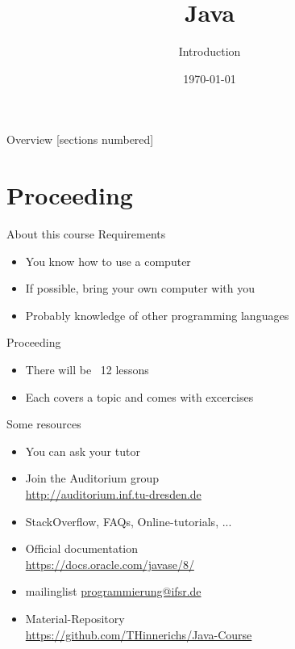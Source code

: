 


\title{Java}
\subtitle{Introduction}
\date{\today}




\begin{frame}
	\titlepage
\end{frame}
\begin{frame}{Overview}
	[sections numbered]
	\tableofcontents
\end{frame}

\section{Proceeding}
\begin{frame}{About this course}
	Requirements
	\begin{itemize}
		\item You know how to use a computer
        \item If possible, bring your own computer with you
		\item Probably knowledge of other programming languages
	\end{itemize}
	Proceeding
	\begin{itemize}
		\item There will be ~12 lessons
		\item Each covers a topic and comes with excercises
	\end{itemize}
\end{frame}

\begin{frame}{Some resources}
	\begin{itemize}
		\item You can ask your tutor
		\item Join the Auditorium group \hfill \\
			\url{http://auditorium.inf.tu-dresden.de}
		\item StackOverflow, FAQs, Online-tutorials, ... \hfill \\
		\item Official documentation \hfill \\
			\url{https://docs.oracle.com/javase/8/}
        \item mailinglist \url{programmierung@ifsr.de}
		\item Material-Repository \\
			\url{https://github.com/THinnerichs/Java-Course}
	\end{itemize}
\end{frame}

